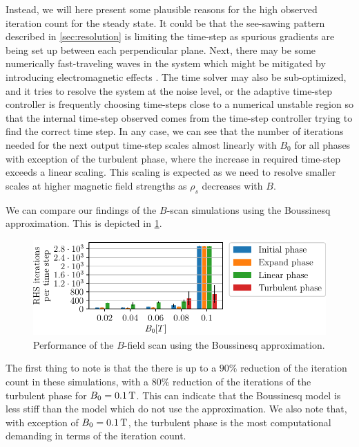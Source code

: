 Instead, we will here present some plausible reasons for the high observed iteration count for the steady state.
It could be that the see-sawing pattern described in \cref{sec:resolution} is limiting the time-step as spurious gradients are being set up between each perpendicular plane.
Next, there may be some numerically fast-traveling waves in the system which might be mitigated by introducing electromagnetic effects \cite{Dudson2015Private}.
The time solver may also be sub-optimized, and it tries to resolve the system at the noise level, or the adaptive time-step controller is frequently choosing time-steps close to a numerical unstable region so that the internal time-step observed comes from the time-step controller trying to find the correct time step.
In any case, we can see that the number of iterations needed for the next output time-step scales almost linearly with $B_0$ for all phases with exception of the turbulent phase, where the increase in required time-step exceeds a linear scaling.
This scaling is expected as we need to resolve smaller scales at higher magnetic field strengths as $\rho_s$ decreases with $B$.

We can compare our findings of the $B$-scan simulations using the Boussinesq approximation.
This is depicted in \cref{fig:BoussPerformance}.
%
\begin{figure}[htb]
    \centering
    \includegraphics{fig/results/performance/RHSEvalsPerTimeBoussinesqScan}
    \caption{Performance of the $B$-field scan using the Boussinesq approximation.}
    \label{fig:BoussPerformance}
\end{figure}
%
The first thing to note is that the there is up to a $90 \%$ reduction of the iteration count in these simulations, with a $80\%$ reduction of the iterations of the turbulent phase for $B_0=0.1\, \text{T}$.
This can indicate that the Boussinesq model is less stiff than the model which do not use the approximation.
We also note that, with exception of $B_0=0.1\, \text{T}$, the turbulent phase is the most computational demanding in terms of the iteration count.

